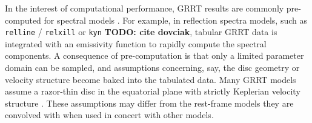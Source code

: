 \documentclass[fleqn,usenatbib]{mnras}
\newcommand{\todo}[1]{{\noindent \bf \color{red} TODO: #1}}
\begin{document}
In the interest of computational performance, GRRT results are commonly
pre-computed for spectral models \citep{laor_line_1991}. For example, in
reflection spectra models, such as \texttt{relline} / \texttt{relxill}
\citep{dauser_broad_2010, dauser_relativistic_2016} or \texttt{kyn} \todo{cite
dovciak}, tabular GRRT data is integrated with an emissivity function to rapidly
compute the spectral components. A consequence of pre-computation is that only a
limited parameter domain can be sampled, and assumptions concerning, say, the
disc geometry or velocity structure become baked into the tabulated data. Many
GRRT models assume a razor-thin disc in the equatorial plane with strictly
Keplerian velocity structure \citep[e.g.][]{dovciak_extended_2004,
beckwith_iron_2004, brenneman_constraining_2006, dauser_broad_2010}. These
assumptions may differ from the rest-frame models they are convolved with when
used in concert with other models.

\end{document}
